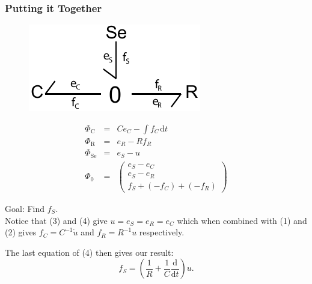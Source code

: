 \documentclass[12pt,reqno]{beamer}
\newcommand{\D}[2]{\frac{\mathrm{d} #1}{\mathrm{d} #2}}
\newcommand{\df}[1]{\mspace{2mu}  \mathrm{d}#1}
\begin{document}
\begin{frame}
\frametitle{Putting it Together}
\begin{scriptsize}
\begin{minipage}{0.4\textwidth}
\begin{figure}
	\includegraphics[width=\textwidth]{RC_bondgraph.pdf}
\end{figure}
\end{minipage}
\begin{minipage}{0.57\textwidth}
\begin{eqnarray}
\Phi_\text{C} &=& Ce_C - \int f_C \df{t}\\
\Phi_\text{R} &=& e_R - Rf_R\\
\Phi_\text{Se} & =& e_S - u\\
\Phi_\text{0} &=&
\left(\begin{matrix}
e_S  - e_C\\
e_S - e_R\\
f_S  + (- f_C) +  (-f_R)
\end{matrix}\right)
\end{eqnarray}
\end{minipage}
Goal: Find $f_S$.\\
Notice that (3) and (4) give $u = e_S =e_R = e_C$ which when combined with (1) and (2) gives $f_C = C^{-1}\dot{u}$ and $f_R = R^{-1}u$ respectively.\\
\vspace{5pt}

The last equation of (4) then gives our result:
\[
f_S = \left(\frac{1}{R} + \frac{1}{C}\D{}{t}\right)u.
\]
\end{scriptsize}
\end{frame}
\end{document}
